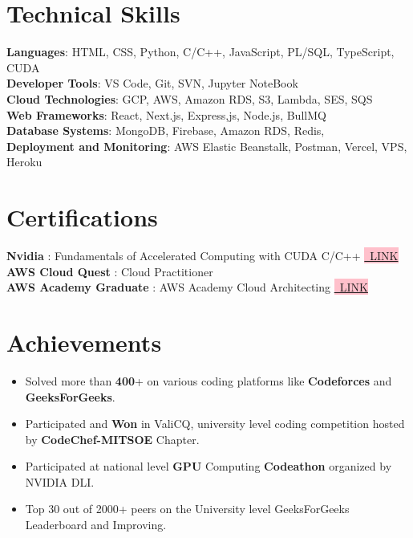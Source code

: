 \documentclass[letterpaper,11pt]{article}
\newcommand{\resumeItem}[1]{
  \item\small{
    {#1 \vspace{-2pt}}
  }
}
\newcommand{\resumeSubHeadingListStart}{\begin{itemize}[leftmargin=0.0in, label={}]}
\newcommand{\resumeSubHeadingListEnd}{\end{itemize}}
\newcommand{\resumeItemListStart}{\begin{itemize}}
\newcommand{\resumeItemListEnd}{\end{itemize}\vspace{-5pt}}
\begin{document}
\section{Technical Skills}
 \begin{itemize}[leftmargin=0.15in, label={}]
    \small{\item{
     \textbf{Languages}{: HTML, CSS, Python, C/C++, JavaScript, PL/SQL, TypeScript, CUDA} \\
     \textbf{Developer Tools}{: VS Code, Git, SVN, Jupyter NoteBook } \\
     \textbf{Cloud Technologies}{: GCP, AWS, Amazon RDS, S3, Lambda, SES, SQS } \\
     \textbf{Web Frameworks}{: React, Next.js, Express,js, Node.js, BullMQ } \\
     \textbf{Database Systems}{: MongoDB, Firebase, Amazon RDS, Redis, } \\
     \textbf{Deployment and Monitoring}{: AWS Elastic Beanstalk, Postman, Vercel, VPS, Heroku} \\
    }}
 \end{itemize}
 \vspace{-16pt}

%
\section{Certifications}
 \begin{itemize}[leftmargin=0.15in, label={}]
    \small{\item{
     \textbf{Nvidia} : Fundamentals of Accelerated Computing with CUDA C/C++\hspace{0.2cm} \colorbox{pink}{\href{https://courses.nvidia.com/certificates/f4562fbcfdb54cc086b362b4a8e33f64/}{\tiny\ LINK}} \\
     \textbf{AWS Cloud Quest} : Cloud Practitioner \\
     \textbf{AWS Academy Graduate} : AWS Academy Cloud Architecting\hspace{0.2cm} \colorbox{pink}{\href{https://www.credly.com/go/lq267fnl}{\tiny\ LINK}}
    }}
 \end{itemize}
 \vspace{-16pt}


\section{Achievements}
    \resumeSubHeadingListStart
        \resumeItemListStart
            \resumeItem{Solved more than \textbf{400}+ on various coding platforms like \textbf{Codeforces} and \textbf{GeeksForGeeks}.}
            \resumeItem{Participated and \textbf{Won} in ValiCQ, university level coding competition hosted by \textbf{CodeChef-MITSOE} Chapter.}
            \resumeItem{Participated at national level \textbf{GPU} Computing \textbf{Codeathon} organized by NVIDIA DLI.}
            \resumeItem{Top 30 out of 2000+ peers on the University level GeeksForGeeks Leaderboard and Improving.}
        \resumeItemListEnd
     \resumeSubHeadingListEnd
        
\end{document}
